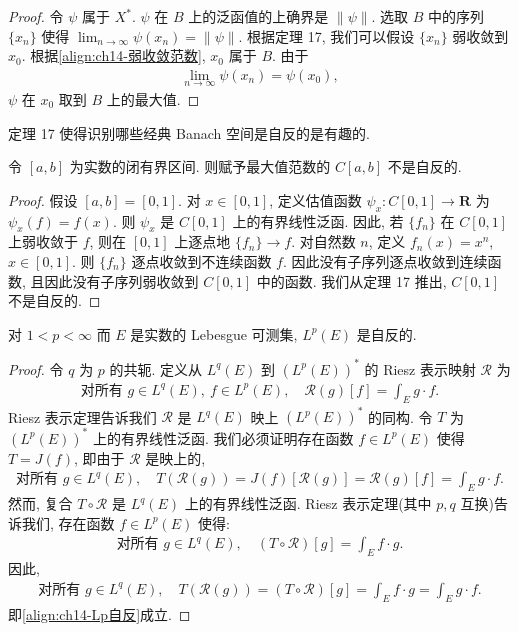 \documentclass[../../main.tex]{subfiles}
\begin{document}
\begin{proof}
令 $\psi$ 属于 $X^{*}$. $\psi$ 在 $B$ 上的泛函值的上确界是 $\|\psi\|$. 选取 $B$ 中的序列 $\{x_{n}\}$ 使得 $\lim_{n\to\infty}\psi(x_{n})=\|\psi\|$. 根据定理 17, 我们可以假设 $\{x_{n}\}$ 弱收敛到 $x_{0}$. 根据\eqref{align:ch14-弱收敛范数}, $x_{0}$ 属于 $B$. 由于
\begin{align*}
\lim_{n\to\infty}\psi(x_{n})=\psi(x_{0}),
\end{align*}
$\psi$ 在 $x_{0}$ 取到 $B$ 上的最大值.
\end{proof}

定理 17 使得识别哪些经典 Banach 空间是自反的是有趣的.

\begin{proposition}\label{proposition:ch14-C[a,b]不自反}
令 $[a,b]$ 为实数的闭有界区间. 则赋予最大值范数的 $C[a,b]$ 不是自反的.
\end{proposition}

\begin{proof}
假设 $[a,b]=[0,1]$. 对 $x\in[0,1]$, 定义估值函数 $\psi_{x}:C[0,1]\to\mathbf{R}$ 为 $\psi_{x}(f)=f(x)$. 则 $\psi_{x}$ 是 $C[0,1]$ 上的有界线性泛函. 因此, 若 $\{f_{n}\}$ 在 $C[0,1]$ 上弱收敛于 $f$, 则在 $[0,1]$ 上逐点地 $\{f_{n}\}\to f$. 对自然数 $n$, 定义 $f_{n}(x)=x^{n}$, $x\in[0,1]$. 则 $\{f_{n}\}$ 逐点收敛到不连续函数 $f$. 因此没有子序列逐点收敛到连续函数, 且因此没有子序列弱收敛到 $C[0,1]$ 中的函数. 我们从定理 17 推出, $C[0,1]$ 不是自反的.
\end{proof}

\begin{proposition}\label{proposition:ch14-Lp自反}
对 $1<p<\infty$ 而 $E$ 是实数的 Lebesgue 可测集, $L^{p}(E)$ 是自反的.
\end{proposition}

\begin{proof}
令 $q$ 为 $p$ 的共轭. 定义从 $L^{q}(E)$ 到 $(L^{p}(E))^{*}$ 的 Riesz 表示映射 $\mathcal{R}$ 为
\begin{align*}
\text{对所有 }g\in L^{q}(E),\ f\in L^{p}(E),\quad\mathcal{R}(g)[f]=\int_{E}g\cdot f.
\end{align*}
Riesz 表示定理告诉我们 $\mathcal{R}$ 是 $L^{q}(E)$ 映上 $(L^{p}(E))^{*}$ 的同构. 令 $T$ 为 $(L^{p}(E))^{*}$ 上的有界线性泛函. 我们必须证明存在函数 $f\in L^{p}(E)$ 使得 $T=J(f)$, 即由于 $\mathcal{R}$ 是映上的,
\begin{align}
\text{对所有 }g\in L^{q}(E),\quad T(\mathcal{R}(g))=J(f)[\mathcal{R}(g)]=\mathcal{R}(g)[f]=\int_{E}g\cdot f.\label{align:ch14-Lp自反}
\end{align}
然而, 复合 $T\circ\mathcal{R}$ 是 $L^{q}(E)$ 上的有界线性泛函. Riesz 表示定理(其中 $p,q$ 互换)告诉我们, 存在函数 $f\in L^{p}(E)$ 使得:
\begin{align*}
\text{对所有 }g\in L^{q}(E),\quad(T\circ\mathcal{R})[g]=\int_{E}f\cdot g.
\end{align*}
因此,
\begin{align*}
\text{对所有 }g\in L^{q}(E),\quad T(\mathcal{R}(g))=(T\circ\mathcal{R})[g]=\int_{E}f\cdot g=\int_{E}g\cdot f.
\end{align*}
即\eqref{align:ch14-Lp自反}成立.
\end{proof}
\end{document}

